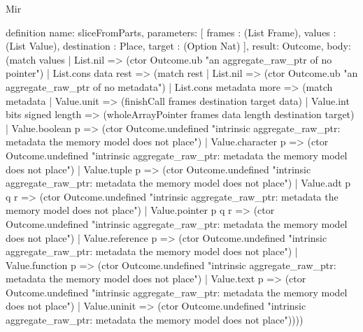 \begin{lexlean}{Mir}
\begin{semanticmodule}
definition{
  name: sliceFromParts,
  parameters: [
    frames : (List Frame),
    values : (List Value),
    destination : Place,
    target : (Option Nat)
  ],
  result: Outcome,
  body: (match values
    | List.nil => (ctor Outcome.ub "an aggregate_raw_ptr of no pointer")
    | List.cons data rest => (match rest
      | List.nil => (ctor Outcome.ub "an aggregate_raw_ptr of no metadata")
      | List.cons metadata more => (match metadata
        | Value.unit => (finishCall frames destination target data)
        | Value.int bits signed length => (wholeArrayPointer frames data length destination target)
        | Value.boolean p => (ctor Outcome.undefined "intrinsic aggregate_raw_ptr: metadata the memory model does not place")
        | Value.character p => (ctor Outcome.undefined "intrinsic aggregate_raw_ptr: metadata the memory model does not place")
        | Value.tuple p => (ctor Outcome.undefined "intrinsic aggregate_raw_ptr: metadata the memory model does not place")
        | Value.adt p q r => (ctor Outcome.undefined "intrinsic aggregate_raw_ptr: metadata the memory model does not place")
        | Value.pointer p q r => (ctor Outcome.undefined "intrinsic aggregate_raw_ptr: metadata the memory model does not place")
        | Value.reference p => (ctor Outcome.undefined "intrinsic aggregate_raw_ptr: metadata the memory model does not place")
        | Value.function p => (ctor Outcome.undefined "intrinsic aggregate_raw_ptr: metadata the memory model does not place")
        | Value.text p => (ctor Outcome.undefined "intrinsic aggregate_raw_ptr: metadata the memory model does not place")
        | Value.uninit => (ctor Outcome.undefined "intrinsic aggregate_raw_ptr: metadata the memory model does not place"))))
}


\end{semanticmodule}
\end{lexlean}
